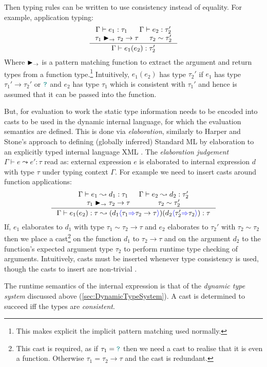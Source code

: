 Then typing rules can be written to use consistency instead of equality. For example, application typing:
\[\inference{\Gamma \vdash e_1 : \tau_1 & \Gamma \vdash e_2 : \tau_2'\\ \tau_1 \funmatch \tau_2 \to \tau & \tau_2 \sim \tau_2'}{\Gamma \vdash e_1(e_2) : \tau_2'}\]
Where $\blacktriangleright_\rightarrow$ is a pattern matching function to extract the argument and return types from a function type.\footnote{This makes explicit the implicit pattern matching used normally.}
Intuitively, $e_1(e_2)$ has type $\tau_2'$ if $e_1$ has type $\tau_1' \to \tau_2'$ or ${\color{teal}\texttt{?}}$ and $e_2$ has type $\tau_1$ which is consistent with $\tau_1'$ and hence is assumed that it can be passed into the function.

But, for evaluation to work the static type information needs to be encoded into casts to be used in the dynamic internal language, for which the evaluation semantics are defined. This is done via \textit{elaboration}, similarly to Harper and Stone's approach to defining (globally inferred) Standard ML \cite{StandardMLTypeTheory} by elaboration to an explicitly typed internal language XML \cite{CoreXML}. The \textit{elaboration judgement} $\Gamma \vdash e \leadsto e' : \tau$ read as: external expression $e$ is elaborated to internal expression $d$ with type $\tau$ under typing context $\Gamma$. For example we need to insert casts around function applications:
\[\inference{\Gamma \vdash e_1 \leadsto d_1 : \tau_1 & \Gamma \vdash e_2 \leadsto d_2 : \tau_2' \\ \tau_1 \funmatch \tau_2 \to \tau  & \tau_2 \sim \tau_2'}{\Gamma \vdash e_1(e_2) : \tau \leadsto (d_1\scast{\tau_1}{\tau_2 \to \tau})(d_2\scast{\tau_2'}{\tau_2}) : \tau}\]
If, $e_1$ elaborates to $d_1$ with type $\tau_1 \sim \tau_2 \to \tau$ and $e_2$ elaborates to $\tau_2'$ with $\tau_2 \sim \tau_2$ then we place a cast\footnote{This cast is required, as if $\tau_1 = {\color{teal}\texttt{?}}$ then we need a cast to realise that it is even a function. Otherwise $\tau_1 = \tau_2 \to \tau$ and the cast is redundant.} on the function $d_1$ to $\tau_2 \to \tau$ and on the argument $d_2$ to the function's expected argument type $\tau_2$ to perform runtime type checking of arguments.
Intuitively, casts must be inserted whenever type consistency is used, though the casts to insert are non-trivial \cite{Gradualizer}.

The runtime semantics of the internal expression is that of the \textit{dynamic type system} discussed above (\ref{sec:DynamicTypeSystem}). A cast is determined to succeed iff the types are \textit{consistent}.

